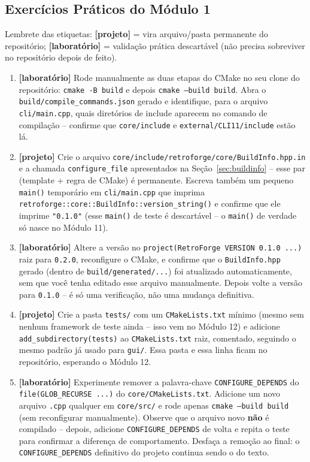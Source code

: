 \subsection{Exercícios Práticos do Módulo 1}

\begin{CaixaDesafio}
Lembrete das etiquetas: \textbf{[projeto]} = vira arquivo/pasta permanente do repositório; \textbf{[laboratório]} = validação prática descartável (não precisa sobreviver no repositório depois de feito).

\begin{enumerate}[label=\textbf{1.\arabic*}]
    \item \textbf{[laboratório]} Rode manualmente as duas etapas do CMake no seu clone do repositório: \texttt{cmake -B build} e depois \texttt{cmake --build build}. Abra o \texttt{build/compile\_commands.json} gerado e identifique, para o arquivo \texttt{cli/main.cpp}, quais diretórios de include aparecem no comando de compilação -- confirme que \texttt{core/include} e \texttt{external/CLI11/include} estão lá.
    \item \textbf{[projeto]} Crie o arquivo \texttt{core/include/retroforge/core/BuildInfo.hpp.in} e a chamada \texttt{configure\_file} apresentados na Seção~\ref{sec:buildinfo} -- esse par (template + regra de CMake) é permanente. Escreva também um pequeno \texttt{main()} temporário em \texttt{cli/main.cpp} que imprima \texttt{retroforge::core::BuildInfo::version\_string()} e confirme que ele imprime \texttt{"0.1.0"} (esse \texttt{main()} de teste é descartável -- o \texttt{main()} de verdade só nasce no Módulo 11).
    \item \textbf{[laboratório]} Altere a versão no \texttt{project(RetroForge VERSION 0.1.0 ...)} raiz para \texttt{0.2.0}, reconfigure o CMake, e confirme que o \texttt{BuildInfo.hpp} gerado (dentro de \texttt{build/generated/...}) foi atualizado automaticamente, sem que você tenha editado esse arquivo manualmente. Depois volte a versão para \texttt{0.1.0} -- é só uma verificação, não uma mudança definitiva.
    \item \textbf{[projeto]} Crie a pasta \texttt{tests/} com um \texttt{CMakeLists.txt} mínimo (mesmo sem nenhum framework de teste ainda -- isso vem no Módulo 12) e adicione \texttt{add\_subdirectory(tests)} ao \texttt{CMakeLists.txt} raiz, comentado, seguindo o mesmo padrão já usado para \texttt{gui/}. Essa pasta e essa linha ficam no repositório, esperando o Módulo 12.
    \item \textbf{[laboratório]} Experimente remover a palavra-chave \texttt{CONFIGURE\_DEPENDS} do \texttt{file(GLOB\_RECURSE ...)} do \texttt{core/CMakeLists.txt}. Adicione um novo arquivo \texttt{.cpp} qualquer em \texttt{core/src/} e rode apenas \texttt{cmake --build build} (sem reconfigurar manualmente). Observe que o arquivo novo \textbf{não} é compilado -- depois, adicione \texttt{CONFIGURE\_DEPENDS} de volta e repita o teste para confirmar a diferença de comportamento. Desfaça a remoção ao final: o \texttt{CONFIGURE\_DEPENDS} definitivo do projeto continua sendo o do texto.

\end{enumerate}
\end{CaixaDesafio}
